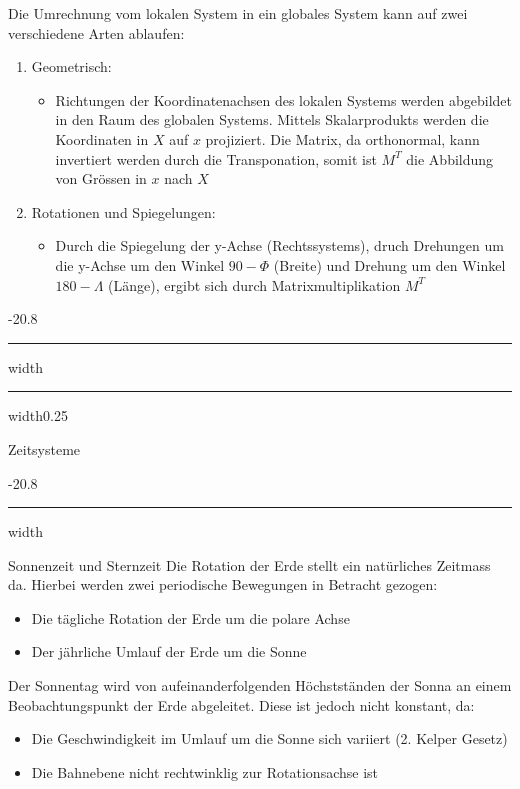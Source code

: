 \documentclass[9pt, landscape, fleqn]{scrartcl}
\makeatletter
\renewcommand{\subsection}{\@startsection{subsection}{1}{0mm}%
{-2\baselineskip}{0.8\baselineskip}%
{\hrule depth 0.2pt width\columnwidth\hrule depth0.75pt
width0.25\columnwidth\vspace*{1.2em}\large\bfseries\rmfamily}}
\renewcommand{\subsubsection}{\@startsection{subsubsection}{1}{0mm}%
{-2\baselineskip}{0.8\baselineskip}%
{\hrule depth 0.2pt width\columnwidth\vspace*{1.2em}\normalsize\bfseries\rmfamily}}
\makeatother
\begin{document}
\begin{multicols*}{3}
Die Umrechnung vom lokalen System in ein globales System kann auf zwei verschiedene Arten ablaufen:

\begin{enumerate}
    \item Geometrisch: \begin{itemize}
        \item Richtungen der Koordinatenachsen des lokalen Systems werden abgebildet in den Raum des globalen Systems. Mittels Skalarprodukts werden die Koordinaten in $X$ auf $x$ projiziert. Die Matrix, da orthonormal, kann invertiert werden durch die Transponation, somit ist $M^T$ die Abbildung von Grössen in $x$ nach $X$
    \end{itemize}
    \item Rotationen und Spiegelungen: \begin{itemize}
        \item Durch die Spiegelung der y-Achse (Rechtssystems), druch Drehungen um die y-Achse um den Winkel $90-\Phi$ (Breite) und Drehung um den Winkel $180-\Lambda$ (Länge), ergibt sich durch Matrixmultiplikation $M^T$ 
    \end{itemize}
\end{enumerate}

\subsection{Zeitsysteme}

\subsubsection{Sonnenzeit und Sternzeit}
Die Rotation der Erde stellt ein natürliches Zeitmass da. Hierbei werden zwei periodische Bewegungen in Betracht gezogen:
\begin{itemize}
    \item Die tägliche Rotation der Erde um die polare Achse
    \item Der jährliche Umlauf der Erde um die Sonne
\end{itemize}

Der Sonnentag wird von aufeinanderfolgenden Höchstständen der Sonna an einem Beobachtungspunkt der Erde abgeleitet. Diese ist jedoch nicht konstant, da:
\begin{itemize}
    \item Die Geschwindigkeit im Umlauf um die Sonne sich variiert (2. Kelper Gesetz)
    \item Die Bahnebene nicht rechtwinklig zur Rotationsachse ist
\end{itemize}


\end{multicols*}
\end{document}
